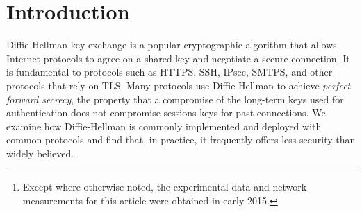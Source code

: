 \begin{abstract}
We investigate the security of Diffie-Hellman key exchange as used in popular
Internet protocols and find it to be less secure than widely believed. First,
we present Logjam, a novel flaw in TLS that lets a man-in-the-middle
downgrade connections to ``export-grade'' Diffie-Hellman. To carry out this
attack, we implement the number field sieve discrete log algorithm. After a
week-long precomputation\footnote{\small Except where otherwise noted, the
experimental data and network measurements for this article were obtained in
early 2015.} for a specified 512-bit group, we can compute arbitrary discrete
logs in that group in about a minute. We find that 82\% of vulnerable servers
use a single 512-bit group, allowing us to compromise connections to 7\% of
Alexa Top Million HTTPS sites. In response, major browsers have changed to
reject short groups.

We go on to consider Diffie-Hellman with 768- and 1024-bit groups. We
estimate that even in the 1024-bit case, the computations are plausible given
nation-state resources. A small number of fixed or standardized groups are
used by millions of servers; performing precomputation for a single 1024-bit
group would allow passive eavesdropping on 18\% of popular HTTPS sites, and a
second group would allow decryption of traffic to 66\% of IPsec VPNs and 26\%
of SSH servers. A close reading of published NSA leaks shows that the
agency's attacks on VPNs are consistent with having achieved such a break. We
conclude that moving to stronger key exchange methods should be a priority
for the Internet community.

\end{abstract}

\section{Introduction}

Diffie-Hellman key exchange is a popular cryptographic algorithm
that allows Internet protocols to agree on a shared key and negotiate
a secure connection.  
It is fundamental to protocols such as
HTTPS, SSH, IPsec, SMTPS, and other protocols that rely on TLS\@.
Many protocols use Diffie-Hellman to achieve \emph{perfect forward secrecy},
the property that a compromise of the long-term keys used for authentication
does not compromise sessions keys for past connections.
We examine how
Diffie-Hellman is commonly implemented and deployed with common
protocols and find that, in practice, it frequently offers less
security than widely believed.

